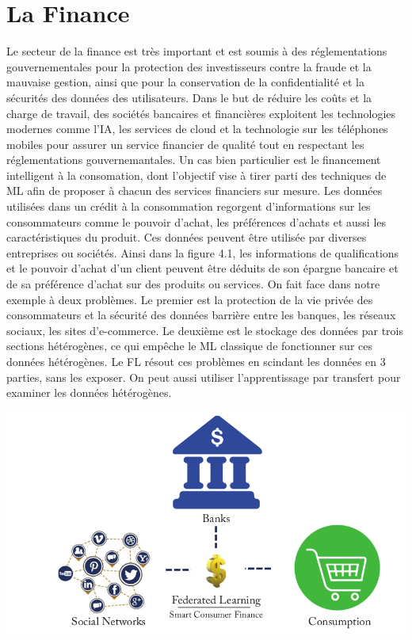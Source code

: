\documentclass[12pt,a4paper,french]{report}
\begin{document}
\section{La Finance}

Le secteur de la finance est très important et est soumis à des réglementations gouvernementales pour la protection des investisseurs contre la fraude et la mauvaise gestion, ainsi que pour la conservation de la confidentialité et la sécurités des données des utilisateurs. Dans le but de réduire les coûts et la charge de travail, des sociétés bancaires et financières exploitent les technologies modernes comme l'IA, les services de cloud et la technologie sur les téléphones mobiles pour assurer un service financier de qualité tout en respectant les réglementations gouvernemantales. Un cas bien particulier est le financement intelligent à la consomation, dont l'objectif vise à tirer parti des techniques de ML afin de proposer à chacun des services financiers sur mesure. Les données utilisées dans un crédit à la consommation regorgent d'informations sur les consommateurs comme le pouvoir d'achat, les préférences d'achats et aussi les caractéristiques du produit. Ces données peuvent être utilisée par diverses entreprises ou sociétés. Ainsi dans la figure 4.1, les informations de qualifications et le pouvoir d'achat d'un client peuvent être déduits de son épargne bancaire et de sa préférence d'achat sur des produits ou services. On fait face dans notre exemple à deux problèmes. Le premier est la protection de la vie privée des consommateurs et la sécurité des données barrière entre les banques, les réseaux sociaux, les sites d'e-commerce. Le deuxième est le stockage des données par trois sections hétérogènes, ce qui empêche le ML classique de fonctionner sur ces données hétérogènes. Le FL résout ces problèmes en scindant les données en 3 parties, sans les exposer. On peut aussi utiliser l'apprentissage par transfert pour examiner les données hétérogènes.

\begin{center}
	\includegraphics[scale=0.3]{finances}
	\label{fig1}
\end{center}
\end{document}
